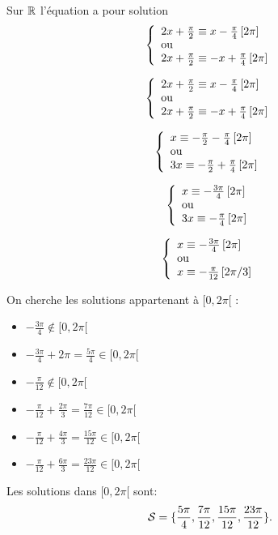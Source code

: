 \documentclass[a4paper, 11pt]{article}
\begin{document}
\begin{cor}
Sur $\mathbb{R}$ l'équation a pour solution 
$$
\left\{ \begin{array}{l}
2x+\frac{\pi}{2}\equiv x-\frac{\pi}{4}\, [2\pi]\\
\textmd{ou}\\
2x+\frac{\pi}{2}\equiv -x+\frac{\pi}{4}\, [2\pi]
\end{array}\right.$$

$$
\left\{ \begin{array}{l}
2x+\frac{\pi}{2}\equiv x-\frac{\pi}{4}\, [2\pi]\\
\textmd{ou}\\
2x+\frac{\pi}{2}\equiv -x+\frac{\pi}{4}\, [2\pi]
\end{array}\right.$$


$$
\left\{ \begin{array}{l}
x\equiv -\frac{\pi}{2}-\frac{\pi}{4}\, [2\pi]\\
\textmd{ou}\\
3x\equiv -\frac{\pi}{2}+\frac{\pi}{4}\, [2\pi]
\end{array}\right.$$


$$
\left\{ \begin{array}{l}
x\equiv -\frac{3\pi}{4}\, [2\pi]\\
\textmd{ou}\\
3x\equiv -\frac{\pi}{4}\, [2\pi]
\end{array}\right.$$

$$
\left\{ \begin{array}{l}
x\equiv -\frac{3\pi}{4}\, [2\pi]\\
\textmd{ou}\\
x\equiv -\frac{\pi}{12}\, [2\pi/3]
\end{array}\right.$$



On cherche les solutions appartenant à $[0,2\pi[ $ :
\begin{itemize}
\item $-\frac{3\pi}{4} \notin[0,2\pi[  $ 
\item $-\frac{3\pi}{4} +2\pi = \frac{5\pi}{4}\in[0,2\pi[  $ 
\item $-\frac{\pi}{12}  \notin[0,2\pi[  $ 
\item $-\frac{\pi}{12} +\frac{2\pi}{3} = \frac{7\pi}{12} \in [0,2\pi[$
\item $-\frac{\pi}{12} +\frac{4\pi}{3} = \frac{15\pi}{12} \in [0,2\pi[$
\item $-\frac{\pi}{12} +\frac{6\pi}{3} = \frac{23\pi}{12} \in [0,2\pi[$
\end{itemize}


Les solutions dans $[0,2\pi[$ sont:
$$\mathcal{S}  = \{ \frac{5\pi}{4} , \frac{7\pi}{12} , \frac{15\pi}{12} ,  \frac{23\pi}{12}\}.$$

\end{cor}
\end{document}
